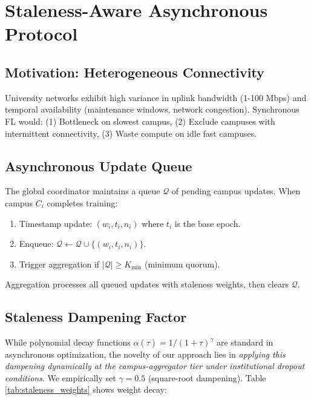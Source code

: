 \documentclass[conference]{IEEEtran}
\begin{document}
\section{Staleness-Aware Asynchronous Protocol}

\subsection{Motivation: Heterogeneous Connectivity}

University networks exhibit high variance in uplink bandwidth (1-100 Mbps) and temporal availability (maintenance windows, network congestion). Synchronous FL would: (1) Bottleneck on slowest campus, (2) Exclude campuses with intermittent connectivity, (3) Waste compute on idle fast campuses.

\subsection{Asynchronous Update Queue}

The global coordinator maintains a queue $\mathcal{Q}$ of pending campus updates. When campus $C_i$ completes training:

\begin{enumerate}
    \item Timestamp update: $(w_i, t_i, n_i)$ where $t_i$ is the base epoch.
    \item Enqueue: $\mathcal{Q} \leftarrow \mathcal{Q} \cup \{(w_i, t_i, n_i)\}$.
    \item Trigger aggregation if $|\mathcal{Q}| \geq K_{\min}$ (minimum quorum).
\end{enumerate}

Aggregation processes all queued updates with staleness weights, then clears $\mathcal{Q}$.

\subsection{Staleness Dampening Factor}

While polynomial decay functions $\alpha(\tau) = 1/(1+\tau)^\gamma$ are standard in asynchronous optimization, the novelty of our approach lies in \textit{applying this dampening dynamically at the campus-aggregator tier under institutional dropout conditions}. We empirically set $\gamma = 0.5$ (square-root dampening). Table \ref{tab:staleness_weights} shows weight decay:
\end{document}
